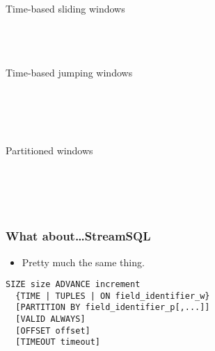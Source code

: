 \documentclass[brown, compress, mathserif]{beamer}
\begin{document}
\begin{frame}{Time-based sliding windows}
  \hlstd{}\hspace*{\fill}\\
  \hlstd{}\hlstd{}\hlsym{(}\hlsym{) }\hlstd{}\\
  \\
  \hlsym{= }\hlstd{}\hlstd{}\hspace*{\fill}\\
\end{frame}


\begin{frame}{Time-based jumping windows}
  \hlstd{}\hspace*{\fill}\\
  \hlstd{}\hspace*{\fill}\\
  \hlstd{}\hlstd{}\hlsym{(}\hlsym{) }\hlstd{}\\
  \\
  \hlsym{= }\hlstd{}\hlstd{}\hspace*{\fill}\\
\end{frame}


\begin{frame}{Partitioned windows}
  \hlstd{}\hspace*{\fill}\\
  \hlstd{}\hspace*{\fill}\\
  \hlstd{}\hlstd{}\hlsym{(}\hlsym{) }\hlstd{}\\
  \\
  \hlstd{}\hspace*{\fill}\\
\end{frame}


\begin{frame}[fragile]
  \frametitle{What about\ldots StreamSQL}
  \begin{itemize}
  \item Pretty much the same thing.
  \end{itemize}

\begin{verbatim}
SIZE size ADVANCE increment
  {TIME | TUPLES | ON field_identifier_w}
  [PARTITION BY field_identifier_p[,...]]
  [VALID ALWAYS]
  [OFFSET offset]
  [TIMEOUT timeout]
\end{verbatim}
\end{frame}
\end{document}
